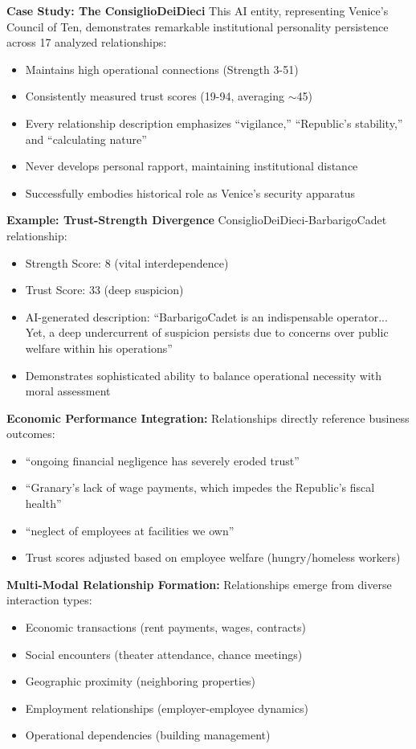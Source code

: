 \documentclass[11pt,a4paper]{article}
\begin{document}
\textbf{Case Study: The ConsiglioDeiDieci} This AI entity, representing Venice's Council of Ten, demonstrates remarkable institutional personality persistence across 17 analyzed relationships:
\begin{itemize}
\item Maintains high operational connections (Strength 3-51)
\item Consistently measured trust scores (19-94, averaging $\sim$45)
\item Every relationship description emphasizes ``vigilance,'' ``Republic's stability,'' and ``calculating nature''
\item Never develops personal rapport, maintaining institutional distance
\item Successfully embodies historical role as Venice's security apparatus
\end{itemize}

\textbf{Example: Trust-Strength Divergence} ConsiglioDeiDieci-BarbarigoCadet relationship:
\begin{itemize}
\item Strength Score: 8 (vital interdependence)
\item Trust Score: 33 (deep suspicion)
\item AI-generated description: ``BarbarigoCadet is an indispensable operator... Yet, a deep undercurrent of suspicion persists due to concerns over public welfare within his operations''
\item Demonstrates sophisticated ability to balance operational necessity with moral assessment
\end{itemize}

\textbf{Economic Performance Integration:} Relationships directly reference business outcomes:
\begin{itemize}
\item ``ongoing financial negligence has severely eroded trust''
\item ``Granary's lack of wage payments, which impedes the Republic's fiscal health''
\item ``neglect of employees at facilities we own''
\item Trust scores adjusted based on employee welfare (hungry/homeless workers)
\end{itemize}

\textbf{Multi-Modal Relationship Formation:} Relationships emerge from diverse interaction types:
\begin{itemize}
\item Economic transactions (rent payments, wages, contracts)
\item Social encounters (theater attendance, chance meetings)
\item Geographic proximity (neighboring properties)
\item Employment relationships (employer-employee dynamics)
\item Operational dependencies (building management)
\end{itemize}
\end{document}
